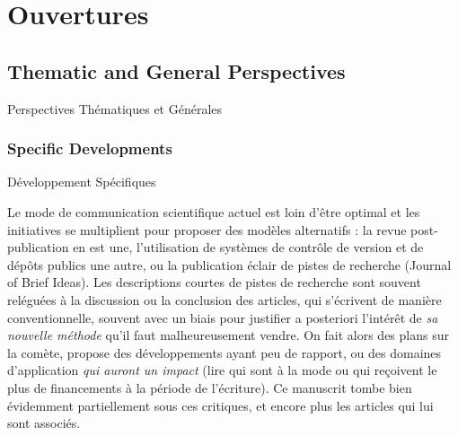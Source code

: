 


\chapter*{Ouvertures}

\label{ch:opening}


\newpage

\section*{Thematic and General Perspectives}{Perspectives Thématiques et Générales}



%


\subsection*{Specific Developments}{Développement Spécifiques}



Le mode de communication scientifique actuel est loin d'être optimal 
et les initiatives se multiplient pour proposer des modèles alternatifs : la revue post-publication en est une, l'utilisation de systèmes de contrôle de version et de dépôts publics une autre, ou la publication éclair de pistes de recherche (Journal of Brief Ideas).
Les descriptions courtes de pistes de recherche sont souvent reléguées à la discussion ou la conclusion des articles, qui s'écrivent de manière conventionnelle, souvent avec un biais pour justifier a posteriori l'intérêt de \emph{sa nouvelle méthode} qu'il faut malheureusement vendre. On fait alors des plans sur la comète, propose des développements ayant peu de rapport, ou des domaines d'application \emph{qui auront un impact} (lire qui sont à la mode ou qui reçoivent le plus de financements à la période de l'écriture). %
Ce manuscrit tombe bien évidemment partiellement sous ces critiques, et encore plus les articles qui lui sont associés.


